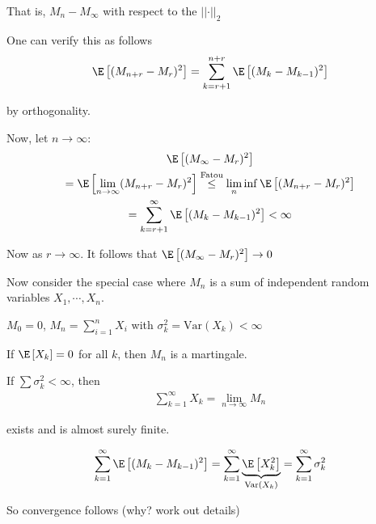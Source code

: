 \noindent That is, $M_n-M_\infty$ with respect to the $\left|\left|\cdot\right|\right|_2$\par
\noindent One can verify this as follows
\begin{equation*}
  \begin{gathered}
    \E\left[(M_{n+r}-M_r)^2\right] = \sum_{k=r+1}^{n+r}\E\left[(M_k-M_{k-1})^2\right]
  \end{gathered}
\end{equation*}\par
\noindent by orthogonality.\par
\noindent Now, let $n\to\infty$:
\begin{equation*}
  \begin{gathered}
    \E\left[(M_\infty-M_r)^2\right]\\
    = \E\left[\lim_{n\to\infty}(M_{n+r}-M_r)^2\right]\stackrel{\text{Fatou}}{\leq}\lim_{n}\inf\E\left[(M_{n+r}-M_r)^2\right]\\
    = \sum_{k=r+1}^{\infty}\E\left[(M_k-M_{k-1})^2\right]<\infty
  \end{gathered}
\end{equation*}\par
\noindent Now as $r\to\infty$. It follows that $\E\left[(M_\infty-M_r)^2\right]\to0$
\par\bigskip
\noindent Now consider the special case where $M_n$ is a sum of independent random variables $X_1,\cdots, X_n$.\par
\noindent $M_0=0$, $M_n = \sum_{i=1}^{n}X_i$ with $\sigma_k^2 = \text{Var}\left(X_k\right)<\infty$\par
\noindent If $\E\left[X_k\right] = 0$ for all $k$, then $M_n$ is a martingale.
\par\bigskip
\begin{theo}[]{}
  If $\sum\sigma_k^2<\infty$, then 
  \begin{equation*}
    \begin{gathered}
      \sum_{k=1}^{\infty}X_k = \lim_{n\to\infty}M_n
    \end{gathered}
  \end{equation*}\par
  \noindent exists and is almost surely finite.
\end{theo}
\par\bigskip
\begin{prf}[]{}
  \begin{equation*}
    \begin{gathered}
      \sum_{k=1}^{\infty}\E\left[(M_k-M_{k-1})^2\right] = \sum_{k=1}^{\infty}\underbrace{\E\left[X_k^2\right]}_{\substack{\text{Var}\left(X_k\right)}} = \sum_{k=1}^{\infty}\sigma_k^2
    \end{gathered}
  \end{equation*}\par
  \noindent So convergence follows (why? work out details)
\end{prf}
